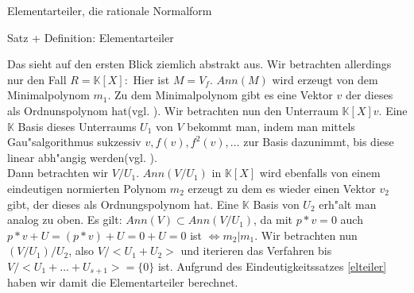 \documentclass[a4paper]{article}
\begin{document}
\begin{section}{Elementarteiler, die rationale Normalform}
\begin{subsection}{Satz + Definition: Elementarteiler}
\end{subsection}
Das sieht auf den ersten Blick ziemlich abstrakt aus. Wir betrachten allerdings nur den Fall $R=\mathbb{K}[X]:$ Hier ist $M = V_f$. $Ann(M)$ wird erzeugt von dem Minimalpolynom $m_1$. Zu dem Minimalpolynom gibt es eine Vektor $v$ der dieses als Ordnunspolynom hat(vgl. \cite{min}). Wir betrachten nun den Unterraum $\mathbb{K}[X] v$. Eine $\mathbb{K}$ Basis dieses Unterraums $U_1$ von $V$ bekommt man, indem man mittels Gau"salgorithmus sukzessiv $v,f(v), f^2(v), \ldots$ zur Basis dazunimmt, bis diese linear abh"angig werden(vgl. \cite{gauss}).\\
Dann betrachten wir $V/U_1$. $Ann(V/U_1)$ in $\mathbb{K}[X]$ wird ebenfalls von einem eindeutigen normierten Polynom $m_2$ erzeugt zu dem es wieder einen Vektor $v_2$ gibt, der dieses als Ordnungspolynom hat. Eine $\mathbb{K}$ Basis von $U_2$ erh"alt man analog zu oben. Es gilt: $Ann(V) \subset Ann(V/U_1)$, da mit $p*v=0$ auch $p*v+U=(p*v)+U=0+U=0$ ist $\Leftrightarrow m_2 | m_1$. Wir betrachten nun $(V/U_1)/U_2$, also $V/<U_1 + U_2>$ und iterieren das Verfahren bis $V/<U_1 + \ldots + U_{s+1}>=\{0\}$ ist. Aufgrund des Eindeutigkeitssatzes \ref{elteiler} haben wir damit die Elementarteiler berechnet.
\end{section}
\end{document}
